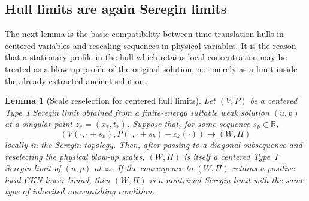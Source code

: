 \documentclass[11pt]{amsart}
\numberwithin{equation}{section}
\theoremstyle{plain}
\newtheorem{lemma}[theorem]{Lemma}
\theoremstyle{definition}
\theoremstyle{remark}
\begin{document}
\subsection{Hull limits are again Seregin limits}

The next lemma is the basic compatibility between time-translation hulls in
centered variables and rescaling sequences in physical variables.  It is the
reason that a stationary profile in the hull which retains local concentration
may be treated as a blow-up profile of the original solution, not merely as a
limit inside the already extracted ancient solution.

\begin{lemma}[Scale reselection for centered hull limits]
\label{lem:R3-hull-is-seregin}
Let \((V,P)\) be a centered Type~I Seregin limit obtained from a finite-energy
suitable weak solution \((u,p)\) at a singular point \(z_*=(x_*,t_*)\).  Suppose
that, for some sequence \(s_k\in\mathbb R\),
\[
   (V(\cdot,\cdot+s_k),P(\cdot,\cdot+s_k)-c_k(\cdot))
   \to (W,\Pi)
\]
locally in the Seregin topology.  Then, after passing to a diagonal subsequence
and reselecting the physical blow-up scales, \((W,\Pi)\) is itself a centered
Type~I Seregin limit of \((u,p)\) at \(z_*\).  If the convergence to \((W,\Pi)\)
retains a positive local CKN lower bound, then \((W,\Pi)\) is a nontrivial
Seregin limit with the same type of inherited nonvanishing condition.
\end{lemma}
\end{document}
